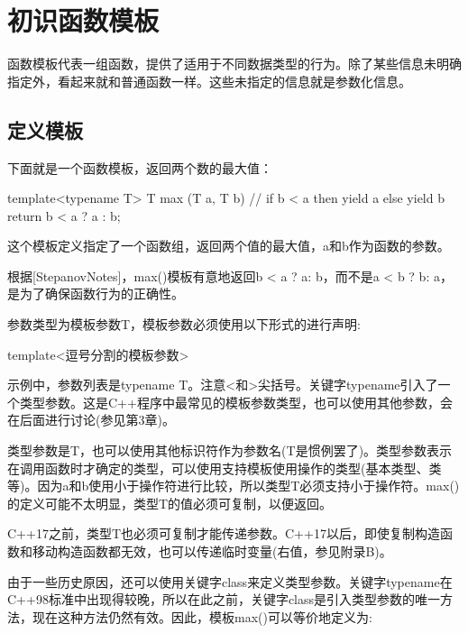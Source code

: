 \section{初识函数模板}

函数模板代表一组函数，提供了适用于不同数据类型的行为。除了某些信息未明确指定外，看起来就和普通函数一样。这些未指定的信息就是参数化信息。

\subsection{定义模板}

下面就是一个函数模板，返回两个数的最大值：

\begin{cpp}
template<typename T>
T max (T a, T b)
{
	// if b < a then yield a else yield b
	return b < a ? a : b;
}
\end{cpp}

这个模板定义指定了一个函数组，返回两个值的最大值，a和b作为函数的参数。

\begin{notice}根据[StepanovNotes]，max()模板有意地返回b < a ? a: b，而不是a < b ? b: a，是为了确保函数行为的正确性。
\end{notice}

参数类型为模板参数T，模板参数必须使用以下形式的进行声明:

\begin{cpp}
template<逗号分割的模板参数>
\end{cpp}

示例中，参数列表是typename T。注意<和>尖括号。关键字typename引入了一个类型参数。这是C++程序中最常见的模板参数类型，也可以使用其他参数，会在后面进行讨论(参见第3章)。

类型参数是T，也可以使用其他标识符作为参数名(T是惯例罢了)。类型参数表示在调用函数时才确定的类型，可以使用支持模板使用操作的类型(基本类型、类等)。因为a和b使用小于操作符进行比较，所以类型T必须支持小于操作符。max()的定义可能不太明显，类型T的值必须可复制，以便返回。

\begin{notice}C++17之前，类型T也必须可复制才能传递参数。C++17以后，即使复制构造函数和移动构造函数都无效，也可以传递临时变量(右值，参见附录B)。
\end{notice}

由于一些历史原因，还可以使用关键字class来定义类型参数。关键字typename在C++98标准中出现得较晚，所以在此之前，关键字class是引入类型参数的唯一方法，现在这种方法仍然有效。因此，模板max()可以等价地定义为:

